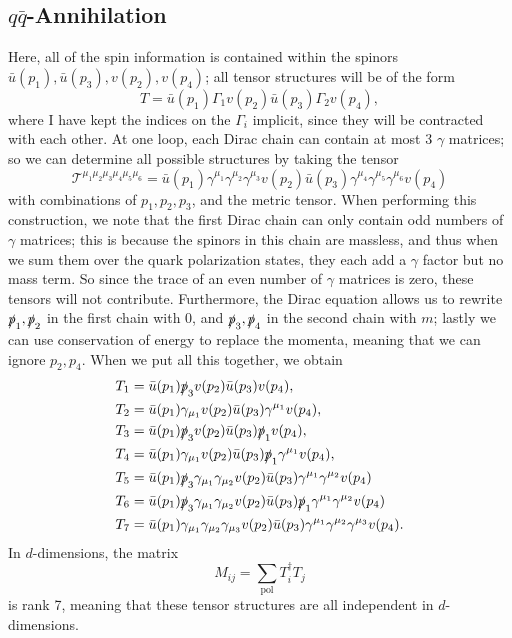 \documentclass[12pt]{article}
\numberwithin{equation}{section}
\numberwithin{figure}{section}
\numberwithin{table}{section}
\begin{document}
	\subsection{\(q\bar{q}\)-Annihilation}
	
	Here, all of the spin information is contained within the spinors \(\bar{u}(p_1),\bar{u}(p_3),v(p_2),v(p_4)\); all tensor structures will be of the form  
	\begin{equation}
	T=\bar{u}(p_1)\Gamma_1v(p_2)\bar{u}(p_3)\Gamma_2v(p_4),
	\end{equation}
	where I have kept the indices on the \(\Gamma_i\) implicit, since they will be contracted with each other. At one loop, each Dirac chain can contain at most 3 \(\gamma\) matrices; so we can determine all possible structures by taking the tensor 
	\begin{equation}
	\mathcal{T}^{\mu_1\mu_2\mu_3\mu_4\mu_5\mu_6}=\bar{u}(p_1)\gamma^{\mu_1}\gamma^{\mu_2}\gamma^{\mu_3}v(p_2)\bar{u}(p_3)\gamma^{\mu_4}\gamma^{\mu_5}\gamma^{\mu_6}v(p_4)
	\end{equation}
	with combinations of \(p_1,p_2,p_3\), and the metric tensor. When performing this construction, we note that the first Dirac chain can only contain odd numbers of \(\gamma\) matrices; this is because the spinors in this chain are massless, and thus when we sum them over the quark polarization states, they each add a \(\gamma\) factor but no mass term. So since the trace of an even number of \(\gamma\) matrices is zero, these tensors will not contribute. Furthermore, the Dirac equation allows us to rewrite \(\slashed{p}_1,\slashed{p}_2\) in the first chain with 0, and \(\slashed{p}_3,\slashed{p}_4\) in the second chain with \(m\); lastly we can use conservation of energy to replace the momenta, meaning that we can ignore \(p_2,p_4\). When we put all this together, we obtain  
	\begin{align}
	T_1 & =\bar{u}(p_1)\slashed{p}_3v(p_2)\bar{u}(p_3)v(p_4),\\
	T_2 & =\bar{u}(p_1)\gamma_{\mu_1}v(p_2)\bar{u}(p_3)\gamma^{\mu_1}v(p_4),\\
	T_3 & =\bar{u}(p_1)\slashed{p}_3v(p_2)\bar{u}(p_3)\slashed{p}_1v(p_4),\\
	T_4 & =\bar{u}(p_1)\gamma_{\mu_1}v(p_2)\bar{u}(p_3)\slashed{p}_1\gamma^{\mu_1}v(p_4),\\
	T_5 & =\bar{u}(p_1)\slashed{p}_3\gamma_{\mu_1}\gamma_{\mu_2}v(p_2)\bar{u}(p_3)\gamma^{\mu_1}\gamma^{\mu_2}v(p_4)\\
	T_6 & =\bar{u}(p_1)\slashed{p}_3\gamma_{\mu_1}\gamma_{\mu_2}v(p_2)\bar{u}(p_3)\slashed{p}_1\gamma^{\mu_1}\gamma^{\mu_2}v(p_4)\\
	T_7 & =\bar{u}(p_1)\gamma_{\mu_1}\gamma_{\mu_2}\gamma_{\mu_3}v(p_2)\bar{u}(p_3)\gamma^{\mu_1}\gamma^{\mu_2}\gamma^{\mu_3}v(p_4).
	\end{align}
	In \(d\)-dimensions, the matrix  
	\begin{equation}
	M_{ij}=\sum_\mathrm{pol}T_i^\dagger T_j
	\end{equation}
	is rank 7, meaning that these tensor structures are all independent in \(d\)-dimensions.
\end{document}
